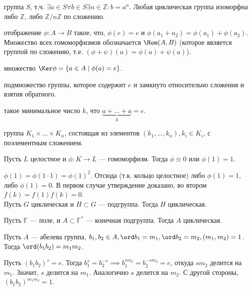 \documentclass[12pt,a4paper]{article}
\begin{document}
% 
% 

 группа $S$, т.ч. $\exists a\in S\forall b\in S\exists n\in \mathbb Z :b=a^n$. Любая циклическая группа изоморфна либо $\mathbb Z $, либо $\mathbb Z /n\mathbb Z $ по сложению.

 отображение $\phi:A\to B$ такое, что, $\phi(e)=e$ и $\phi(a_1+a_2)=\phi(a_1)+\phi(a_2)$. Множество всех гомоморфизмов обозначается $\Hom(A,B)$ (которое является группой по сложению, т.е. $(\phi+\psi)(a)=\phi(a)+\psi(a)$).

 множество $\Ker\phi=\{a\in A\mid \phi(a)=e\}$.

 подмножество группы, которое содержит $e$ и замкнуто относительно сложения и взятия обратного.

 такое минимальное число $k$, что $\underbrace{a+\ldots +a}_k=e$.

 группа $K_1\times \ldots \times K_n$, состоящая из элементов $(k_1,\ldots ,k_n),k_i\in K_i$, с поэлементным сложением.

\lemma Пусть $L$ целостное и $\phi:K\to L$ --- гомоморфизм. Тогда $\phi\equiv 0$ или $\phi(1)=1$.

\proof $\phi(1)=\phi(1\cdot 1)=\phi(1)^2$. Отсюда (т.к. кольцо целостное) либо $\phi(1)=1$, либо $\phi(1)=0$. В первом случае утверждение доказано, во втором $f(k)=f(1)f(k)=0$.\QEDA\\

\lemma Пусть $G$ циклическая и $H\subset G$ --- подгруппа. Тогда $H$ циклическая.

\newpage 

\theorem Пусть $\mathbb F $ --- поле, и $A\subset \mathbb F^*$ --- конечная подгруппа. Тогда $A$ циклическая.\label{primitive}

\lemma Пусть $A$ --- абелева группа, $b_1,b_2\in A,\ord b_1=m_1,\ord b_2=m_2,(m_1,m_2)=1$. Тогда $\ord(b_1b_2)=m_1m_2$.\label{ordshift}

\proof Пусть $(b_1b_2)^s=e$. Тогда $b_1^s=b_2^{-s}\implies b_1^{sm_2}=b_2^{-sm_2}=e$, откуда $sm_2$ делится на $m_1$. Значит, $s$ делится на $m_1$. Аналогично $s$ делится на $m_2$. С другой стороны, $(b_1b_2)^{m_1m_2}=1$.\QEDA\\
\end{document}
